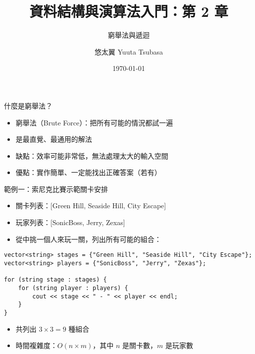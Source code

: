 \documentclass{beamer}
\begin{document}
\title{資料結構與演算法入門：第 2 章}
\subtitle{窮舉法與遞迴}
\author{悠太翼 Yuuta Tsubasa}
\date{\today}

\frame{\titlepage}

\begin{frame}{什麼是窮舉法？}
\begin{itemize}
    \item 窮舉法（Brute Force）：把所有可能的情況都試一遍
    \item 是最直覺、最通用的解法
    \item 缺點：效率可能非常低，無法處理太大的輸入空間
    \item 優點：實作簡單、一定能找出正確答案（若有）
\end{itemize}
\end{frame}

\begin{frame}[fragile]{範例一：索尼克比賽示範關卡安排}
\begin{itemize}
    \item 關卡列表：[Green Hill, Seaside Hill, City Escape]
    \item 玩家列表：[SonicBoss, Jerry, Zexas]
    \item 從中挑一個人來玩一關，列出所有可能的組合：
\end{itemize}

\begin{lstlisting}[style=cppstyle]
vector<string> stages = {"Green Hill", "Seaside Hill", "City Escape"};
vector<string> players = {"SonicBoss", "Jerry", "Zexas"};

for (string stage : stages) {
    for (string player : players) {
        cout << stage << " - " << player << endl;
    }
}
\end{lstlisting}

\begin{itemize}
    \item 共列出 $3 \times 3 = 9$ 種組合
    \item 時間複雜度：$O(n \times m)$，其中 $n$ 是關卡數，$m$ 是玩家數
\end{itemize}
\end{frame}
\end{document}
